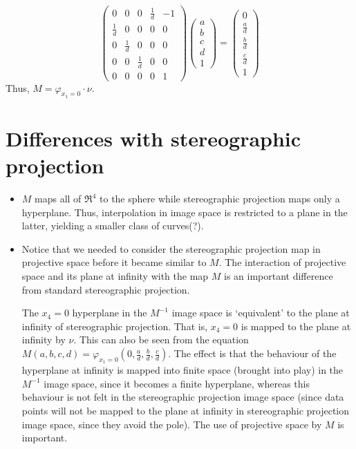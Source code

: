 \[
	\left( \begin{array}{ccccc} 
	0 & 0 & 0 & \frac{1}{d} & -1 \\
	\frac{1}{d} & 0 & 0 & 0 & 0 \\
	0 & \frac{1}{d} & 0 & 0 & 0 \\
	0 & 0 & \frac{1}{d} & 0 & 0 \\
	0 & 0 & 0 & 0 & 1
	\end{array} \right)
	\left( \begin{array}{c}
	a \\ b \\ c \\ d \\ 1
	\end{array} \right)
	= \left( \begin{array}{c}
	0 \\ \frac{a}{d} \\ \frac{b}{d} \\ \frac{c}{d} \\ 1
	\end{array} \right)
\]
Thus, $M = \varphi_{x_1=0} \cdot \nu$.

\section{Differences with stereographic projection}

\begin{itemize}
\item
$M$ maps all of $\Re^4$ to the sphere while stereographic projection
maps only a hyperplane.
Thus, interpolation in image space is restricted to a plane in the latter,
yielding a smaller class of curves(?).
\item
Notice that we needed to consider the stereographic projection map
in projective space before it became similar to $M$.
The interaction of projective space and its plane at infinity with the
map $M$ is an important difference from standard stereographic projection.

The $x_4=0$ hyperplane in the $M^{-1}$ image space
is `equivalent' to the plane at infinity of stereographic projection.
That is, $x_4=0$ is mapped to the plane at infinity by $\nu$.
This can also be seen from the equation 
$M(a,b,c,d) = \varphi_{x_1=0} (0,\frac{a}{d},\frac{b}{d},\frac{c}{d})$.
The effect is that the behaviour of the hyperplane at infinity is 
mapped into finite space (brought
into play) in the $M^{-1}$ image space, since it becomes a finite hyperplane,
whereas this behaviour is not felt in the
stereographic projection image space (since data points will not be
mapped to the plane at infinity in stereographic projection image space,
since they avoid the pole).
The use of projective space by $M$ is important.
\end{itemize}

